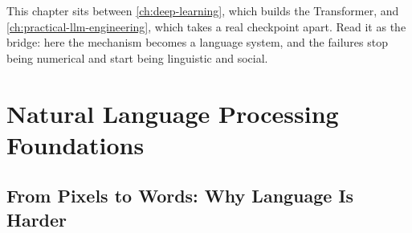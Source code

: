 \begin{engineernote}
This chapter sits between \cref{ch:deep-learning}, which builds the Transformer,
and \cref{ch:practical-llm-engineering}, which takes a real checkpoint apart.
Read it as the bridge: here the mechanism becomes a language system, and the
failures stop being numerical and start being linguistic and social.
\end{engineernote}

\section{Natural Language Processing Foundations}

\subsection{From Pixels to Words: Why Language Is Harder}

